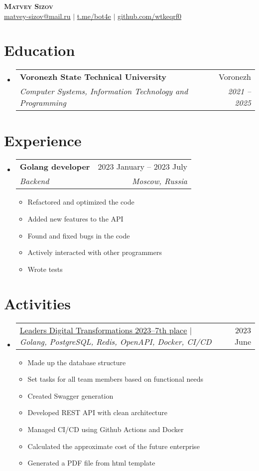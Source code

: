 \documentclass[letterpaper,11pt]{article}
\makeatletter
\newcommand{\resumeItem}[1]{
  \item\small{
    {#1 \vspace{-2pt}}
  }
}
\newcommand{\resumeSubheading}[4]{
  \vspace{-2pt}\item
    \begin{tabular*}{0.97\textwidth}[t]{l@{\extracolsep{\fill}}r}
      \textbf{#1} & #2 \\
      \textit{\small#3} & \textit{\small #4} \\
    \end{tabular*}\vspace{-7pt}
}
\newcommand{\resumeProjectHeading}[2]{
    \item
    \begin{tabular*}{0.97\textwidth}{l@{\extracolsep{\fill}}r}
      \small#1 & #2 \\
    \end{tabular*}\vspace{-7pt}
}
\newcommand{\resumeSubHeadingListStart}{\begin{itemize}[leftmargin=0.15in, label={}]}
\newcommand{\resumeSubHeadingListEnd}{\end{itemize}}
\newcommand{\resumeItemListStart}{\begin{itemize}}
\newcommand{\resumeItemListEnd}{\end{itemize}\vspace{-5pt}}
\makeatother
\begin{document}

\begin{center}
	\textbf{\Huge \scshape Matvey Sizov} \\ \vspace{1pt}
	\href{mailto:matvey-sizov@mail.ru}{\underline{matvey-sizov@mail.ru}} $|$ 
	\href{https://t.me/bot4e}{\underline{t.me/bot4e}} $|$
	\href{https://github.com/wtkeqrf0}{\underline{github.com/wtkeqrf0}}
\end{center}


\section{Education}
\resumeSubHeadingListStart
\resumeSubheading
{Voronezh State Technical University}{Voronezh}
{Computer Systems, Information Technology and Programming}{2021 -- 2025}
\resumeSubHeadingListEnd

\section{Experience}
\resumeSubHeadingListStart

\resumeSubheading
{Golang developer\emph{}}{2023 January -- 2023 July}
{Backend}{Moscow, Russia}
\resumeItemListStart
\resumeItem{Refactored and optimized the code}
\resumeItem{Added new features to the API}
\resumeItem{Found and fixed bugs in the code}
\resumeItem{Actively interacted with other programmers}
\resumeItem{Wrote tests}
\resumeItemListEnd

\resumeSubHeadingListEnd

\section{Activities}
\resumeSubHeadingListStart
\resumeProjectHeading
{\href{https://wtkeqrf0.github.io/CV/Leaders_Digital_Transformations_2023.pdf}{\underline{Leaders Digital Transformations 2023--7th place}} $|$ \emph{Golang, PostgreSQL, Redis, OpenAPI, Docker, CI/CD}}{2023 June}
\resumeItemListStart
\resumeItem{Made up the database structure}
\resumeItem{Set tasks for all team members based on functional needs}
\resumeItem{Created Swagger generation}
\resumeItem{Developed REST API with clean architecture}
\resumeItem{Managed CI/CD using Github Actions and Docker}
\resumeItem{Calculated the approximate cost of the future enterprise}
\resumeItem{Generated a PDF file from html template}
\resumeItemListEnd
\resumeSubHeadingListEnd
\end{document}
